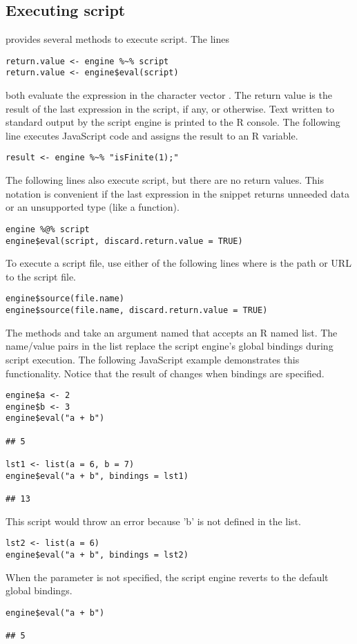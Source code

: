\subsection{Executing script}

 provides several methods to execute script. The lines

\begin{verbatim}
return.value <- engine %~% script
return.value <- engine$eval(script)
\end{verbatim}
both evaluate the expression in the character vector . The return value is the result of the last expression in the script, if any, or  otherwise. Text written to standard output by the script engine is printed to the R console. The following line executes JavaScript code and assigns the result to an R variable.

\begin{verbatim}
result <- engine %~% "isFinite(1);"
\end{verbatim}
The following lines also execute script, but there are no return values. This notation is convenient if the last expression in the snippet returns unneeded data or an unsupported type (like a function).

\begin{verbatim}
engine %@% script
engine$eval(script, discard.return.value = TRUE)
\end{verbatim}
To execute a script file, use either of the following lines where  is the path or URL to the script file.

\begin{verbatim}
engine$source(file.name)
engine$source(file.name, discard.return.value = TRUE)
\end{verbatim}

The methods  and  take an argument named  that accepts an R named list. The name/value pairs in the list replace the script engine's global bindings during script execution. The following JavaScript example demonstrates this functionality. Notice that the result of  changes when bindings are specified.

\begin{verbatim}
engine$a <- 2
engine$b <- 3
engine$eval("a + b")

## 5

lst1 <- list(a = 6, b = 7)
engine$eval("a + b", bindings = lst1)

## 13
\end{verbatim}
This script would throw an error because 'b' is not defined in the list.
\begin{verbatim}
lst2 <- list(a = 6)
engine$eval("a + b", bindings = lst2)
\end{verbatim}
When the  parameter is not specified, the script engine reverts to the default global bindings.
\begin{verbatim}
engine$eval("a + b")

## 5
\end{verbatim}

